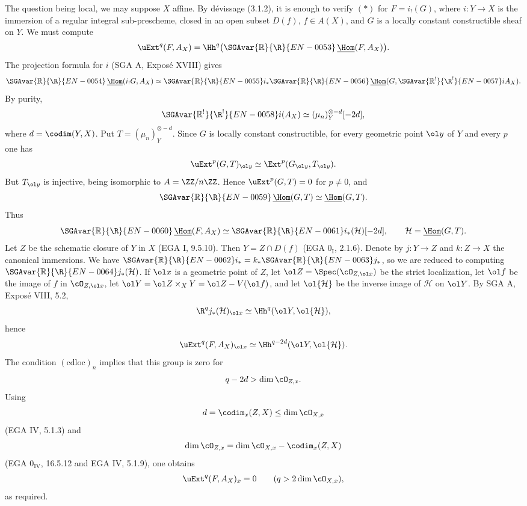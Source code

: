 \begin{prooftext}
The question being local, we may suppose $X$ affine. By dévissage (3.1.2), it is enough to verify $(*)$ for $F=i_!(G)$, where $i:Y\to X$ is the immersion of a regular integral sub-prescheme, closed in an open subset $D(f)$, $f\in A(X)$, and $G$ is a locally constant constructible sheaf on $Y$. We must compute
\[
   \uExt^q(F,A_X)=\Hh^q\bigl(\SGAvar{\mathbb{R}}{\R}{EN-0053}\,\underline{\Hom}(F,A_X)\bigr).
\]
The projection formula for $i$ (SGA A, Exposé XVIII) gives
\[
 \SGAvar{\mathbb{R}}{\R}{EN-0054}\,\underline{\Hom}(i_!G,A_X)
   \simeq
 \SGAvar{\mathbb{R}}{\R}{EN-0055} i_*\SGAvar{\mathbb{R}}{\R}{EN-0056}\,\underline{\Hom}(G,\SGAvar{\mathbb{R}^!}{\R^!}{EN-0057}iA_X).
\]
By purity,
\[
   \SGAvar{\mathbb{R}^!}{\R^!}{EN-0058}i(A_X)\simeq(\mu_n)^{\otimes -d}_Y[-2d],
\]
where $d=\codim(Y,X)$. Put $T=(\mu_n)^{\otimes -d}_Y$. Since $G$ is locally constant constructible, for every geometric point $\ol y$ of $Y$ and every $p$ one has
\[
   \uExt^p(G,T)_{\ol y}\simeq\Ext^p(G_{\ol y},T_{\ol y}).
\]
But $T_{\ol y}$ is injective, being isomorphic to $A=\ZZ/n\ZZ$. Hence $\uExt^p(G,T)=0$ for $p\ne0$, and
\[
   \SGAvar{\mathbb{R}}{\R}{EN-0059}\,\underline{\Hom}(G,T)\simeq\underline{\Hom}(G,T).
\]
Thus
\[
   \SGAvar{\mathbb{R}}{\R}{EN-0060}\,\underline{\Hom}(F,A_X)
      \simeq \SGAvar{\mathbb{R}}{\R}{EN-0061} i_*(\mathcal H)[-2d],
   \qquad \mathcal H=\underline{\Hom}(G,T).
\]
Let $Z$ be the schematic closure of $Y$ in $X$ (EGA I, 9.5.10). Then $Y=Z\cap D(f)$ (EGA $0_{\mathrm I}$, 2.1.6). Denote by $j:Y\to Z$ and $k:Z\to X$ the canonical immersions. We have $\SGAvar{\mathbb{R}}{\R}{EN-0062} i_*=k_*\SGAvar{\mathbb{R}}{\R}{EN-0063} j_*$, so we are reduced to computing $\SGAvar{\mathbb{R}}{\R}{EN-0064} j_*(\mathcal H)$. If $\ol x$ is a geometric point of $Z$, let $\ol Z=\Spec(\cO_{Z,\ol x})$ be the strict localization, let $\ol f$ be the image of $f$ in $\cO_{Z,\ol x}$, let $\ol Y=\ol Z\times_XY=\ol Z-V(\ol f)$, and let $\ol{\mathcal H}$ be the inverse image of $\mathcal H$ on $\ol Y$. By SGA A, Exposé VIII, 5.2,
\[
   \R^qj_*(\mathcal H)_{\ol x}
      \simeq\Hh^q(\ol Y,\ol{\mathcal H}),
\]
hence
\[
   \uExt^q(F,A_X)_{\ol x}
      \simeq\Hh^{q-2d}(\ol Y,\ol{\mathcal H}).
\]
The condition $(\mathrm{cdloc})_n$ implies that this group is zero for
\[
   q-2d>\dim\cO_{Z,x}.
\]
Using
\[
   d=\codim_x(Z,X)\le\dim\cO_{X,x}
\]
(EGA IV, 5.1.3) and
\[
   \dim\cO_{Z,x}
     =\dim\cO_{X,x}-\codim_x(Z,X)
\]
(EGA $0_{\mathrm{IV}}$, 16.5.12 and EGA IV, 5.1.9), one obtains
\[
   \uExt^q(F,A_X)_x=0\qquad(q>2\dim\cO_{X,x}),
\]
as required. \qedtext
\end{prooftext}

